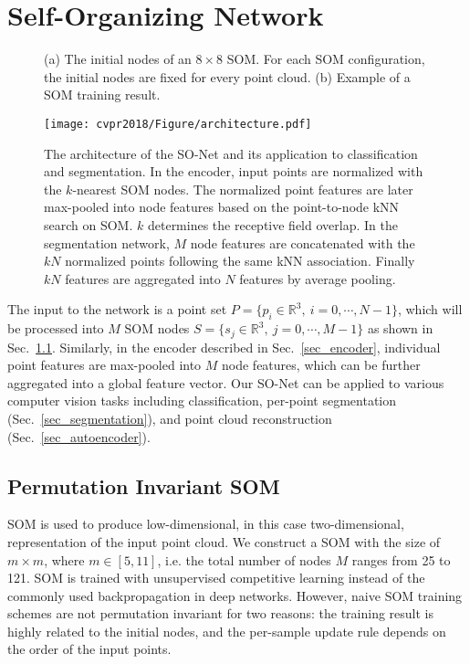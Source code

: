 \documentclass[10pt,twocolumn,letterpaper]{article}
\begin{document}
\section{Self-Organizing Network}
%
\begin{figure}[t!]
        \centering
        \caption{(a) The initial nodes of an $8\times 8$ SOM. For each SOM configuration, the initial nodes are fixed for every point cloud. (b) Example of a SOM training result.}
        \vspace{-4pt}
\end{figure}
%
%
\begin{figure*}[t!] \centering
\texttt{[image: cvpr2018/Figure/architecture.pdf]}
\caption{The architecture of the SO-Net and its application to classification and segmentation. In the encoder, input points are normalized with the $k$-nearest SOM nodes. The normalized point features are later max-pooled into node features based on the point-to-node kNN search on SOM. $k$ determines the receptive field overlap. In the segmentation network, $M$ node features are concatenated with the $kN$ normalized points following the same kNN association. Finally $kN$ features are aggregated into $N$ features by average pooling. }\label{fig_architecture}
\vspace{-4pt}
\end{figure*}
%

The input to the network is a point set $P=\{p_i \in \mathbb{R}^3,~i = 0, \cdots, N-1\}$, which will be processed into $M$ SOM nodes $S=\{s_j \in \mathbb{R}^3,~j = 0, \cdots, M-1\}$ as shown in Sec.~\ref{sec_som}. Similarly, in the encoder described in Sec.~\ref{sec_encoder}, individual point features are max-pooled into $M$ node features, which can be further aggregated into a global feature vector. Our SO-Net can be applied to various computer vision tasks including classification, per-point segmentation (Sec.~\ref{sec_segmentation}), and point cloud reconstruction (Sec.~\ref{sec_autoencoder}).

\subsection{Permutation Invariant SOM} \label{sec_som}

SOM is used to produce low-dimensional, in this case two-dimensional, representation of the input point cloud. We construct a SOM with the size of $m \times m$, where $m \in [5,11]$, i.e. the total number of nodes $M$ ranges from 25 to 121. SOM is trained with unsupervised competitive learning instead of the commonly used backpropagation in deep networks. However, naive SOM training schemes are not permutation invariant for two reasons: the training result is highly related to the initial nodes, and the per-sample update rule depends on the order of the input points. 
\end{document}
